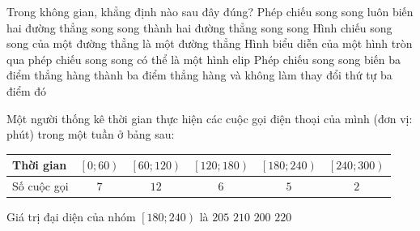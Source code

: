\begin{ex}%
	Trong không gian, khẳng định nào sau đây đúng?
	\choice
	{Phép chiếu song song luôn biến hai đường thẳng song song thành hai đường thẳng song song}
	{Hình chiếu song song của một đường thẳng là một đường thẳng}
	{\True Hình biểu diễn của một hình tròn qua phép chiếu song song có thể là một hình elip}
	{Phép chiếu song song biến ba điểm thẳng hàng thành ba điểm thẳng hàng và không làm thay đổi thứ tự ba điểm đó}
\end{ex}
\begin{ex}%
	Một người thống kê thời gian thực hiện các cuộc gọi điện thoại của mình (đơn vị: phút) trong một tuần ở bảng sau:
	\begin{center}
		\begin{tabular}{|l|c|c|c|c|c|}
			\hline
			Thời gian & $\left[0;60\right)$ & $\left[60;120\right)$ & $\left[120;180\right)$ & 
			$\left[180;240\right)$ & $\left[240;300\right)$ \\
			\hline
			Số cuộc gọi & $7$ & $12$ & $6$ & $5$ & $2$\\
			\hline
		\end{tabular}
	\end{center}
	Giá trị đại diện của nhóm $\left[180;240\right)$ là
	\choice
	{$205$}
	{\True $210$}
	{$200$}
	{$220$}
	\loigiai{
		Giá trị đại diện của nhóm $\left[180;240\right)$ là $\dfrac{180+240}{2}=210$.
	}
\end{ex}
